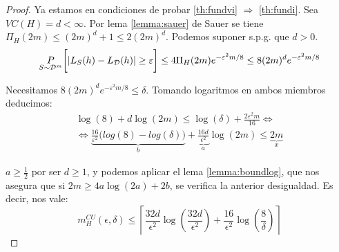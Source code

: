 \begin{proof}
  Ya estamos en condiciones de probar \eqref{th:fundvi} $\Rightarrow$ \eqref{th:fundi}. Sea $VC(H) = d < \infty$. 
  Por lema \ref{lemma:sauer} de Sauer se tiene $\Pi_H(2m) \le (2m)^d + 1 \le 2(2m)^d$. Podemos suponer s.p.g. que $d > 0$.
  \[
    \underset{S\sim \mathcal{D}^m}{P} \bigg[|L_S(h) - L_{\mathcal{D}}(h)| \ge \varepsilon \bigg] 
    \le 4 \Pi_H(2m) e^{-\varepsilon^2 m/8} \le 8 (2m)^d e^{-\varepsilon^2 m/8}
  \]
 
  Necesitamos $8 (2m)^d e^{-\varepsilon^2 m/8} \le \delta$. Tomando logaritmos en ambos miembros deducimos:
  \begin{align*}
    \log(8) + d\log(2m) \le \log(\delta) + \frac{2\varepsilon^2 m}{16} \Leftrightarrow \\
    \Leftrightarrow \underbrace{\frac{16}{\varepsilon^2} \bigg(log(8) - log(\delta) \bigg)}_b + 
    \underbrace{\frac{16 d}{\epsilon^2}}_a \log(2m) \le \underbrace{2m}_x
  \end{align*}
  
  $a \ge \frac{1}{2}$ por ser $d \ge 1$, y podemos aplicar el lema \ref{lemma:boundlog}, que nos asegura que si 
  $2m \ge 4a \log(2a) + 2b$, se verifica la anterior desigualdad. Es decir, nos vale:
  \[
    m_{H}^{CU}(\epsilon, \delta) \le \left\lceil\frac{32 d}{\epsilon^2} \log\left(\frac{32 d}{\epsilon^2}\right) + 
    \frac{16}{\epsilon^2} \log\left(\frac{8}{\delta}\right) \right\rceil
  \]
 
\end{proof}

